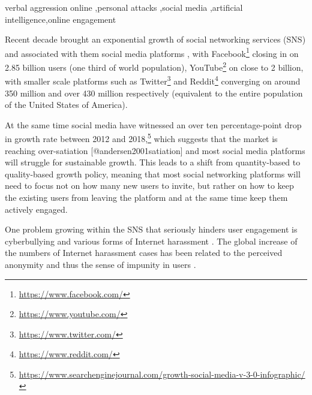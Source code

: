 \documentclass[a4paper,fleqn]{cas-dc}
\begin{document}

\begin{highlights}
\item 
\item 
\item 
\end{highlights}

\begin{keywords}
 verbal aggression online \sep personal attacks \sep social media \sep artificial intelligence\sep online engagement
\end{keywords}

\maketitle




Recent decade brought an exponential growth of social networking services (SNS) and associated with them social media platforms \citep{ortiz2019rise,sheth2020borderless},
 with Facebook\footnote{\url{https://www.facebook.com/}} closing in on 2.85 billion users (one third of world population), YouTube\footnote{\url{https://www.youtube.com/}} on close to 2 billion, with smaller scale platforms such as Twitter\footnote{\url{https://www.twitter.com/}} and Reddit\footnote{\url{https://www.reddit.com/}} converging on around 350 million and over 430 million respectively (equivalent to the entire population of the United States of America). 

At the same time social media have witnessed an over ten percentage-point drop in growth rate between 2012 and 2018,\footnote{\url{https://www.searchenginejournal.com/growth-social-media-v-3-0-infographic/}} which suggests that the market is reaching over-satiation [@andersen2001satiation] and most social media platforms will struggle for sustainable growth.
This leads to a shift from quantity-based to quality-based growth policy, meaning that most social networking platforms will need to focus not on how many new users to invite, but rather on how to keep the existing users from leaving the platform and at the same time keep them actively engaged.

One problem growing within the SNS that  seriously hinders user engagement is  cyberbullying and various forms of Internet harassment \citep{ptaszynski2018automatic}. The global increase of the numbers of Internet harassment cases has been related to the perceived anonymity and thus the sense of impunity in users 
\citep{barlett2015anonymously,barlett2016predicting}. 
\end{document}
